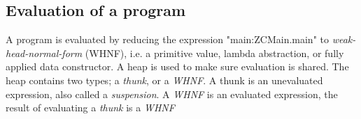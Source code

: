 

\subsection{Evaluation of a program}

A program is evaluated by reducing the expression "main:ZCMain.main" to \emph{weak-head-normal-form} (WHNF),
i.e. a primitive value, lambda abstraction, or fully applied data constructor. A heap is used to make
sure evaluation is shared. The heap contains two types; a \emph{thunk}, or a \emph{WHNF}. A thunk is an unevaluated
expression, also called a \emph{suspension}. A \emph{WHNF} is an evaluated expression, the result of evaluating a \emph{thunk}
is a \emph{WHNF} \cite{tolmach2010ghc}



